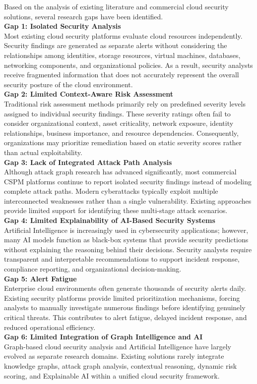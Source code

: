 Based on the analysis of existing literature and commercial cloud security solutions, several research gaps have been identified.\\
\textbf{Gap 1: Isolated Security Analysis}\\
Most existing cloud security platforms evaluate cloud resources independently. Security findings are generated as separate alerts without considering the relationships among identities, storage resources, virtual machines, databases, networking components, and organizational policies. As a result, security analysts receive fragmented information that does not accurately represent the overall security posture of the cloud environment.\\
\textbf{Gap 2: Limited Context-Aware Risk Assessment}\\
Traditional risk assessment methods primarily rely on predefined severity levels assigned to individual security findings. These severity ratings often fail to consider organizational context, asset criticality, network exposure, identity relationships, business importance, and resource dependencies. Consequently, organizations may prioritize remediation based on static severity scores rather than actual exploitability.\\
\textbf{Gap 3: Lack of Integrated Attack Path Analysis}\\
Although attack graph research has advanced significantly, most commercial CSPM platforms continue to report isolated security findings instead of modeling complete attack paths. Modern cyberattacks typically exploit multiple interconnected weaknesses rather than a single vulnerability. Existing approaches provide limited support for identifying these multi-stage attack scenarios.\\
\textbf{Gap 4: Limited Explainability of AI-Based Security Systems}\\
Artificial Intelligence is increasingly used in cybersecurity applications; however, many AI models function as black-box systems that provide security predictions without explaining the reasoning behind their decisions. Security analysts require transparent and interpretable recommendations to support incident response, compliance reporting, and organizational decision-making.\\
\textbf{Gap 5: Alert Fatigue}\\
Enterprise cloud environments often generate thousands of security alerts daily. Existing security platforms provide limited prioritization mechanisms, forcing analysts to manually investigate numerous findings before identifying genuinely critical threats. This contributes to alert fatigue, delayed incident response, and reduced operational efficiency.\\
\textbf{Gap 6: Limited Integration of Graph Intelligence and AI}\\
Graph-based cloud security analysis and Artificial Intelligence have largely evolved as separate research domains. Existing solutions rarely integrate knowledge graphs, attack graph analysis, contextual reasoning, dynamic risk scoring, and Explainable AI within a unified cloud security framework.

